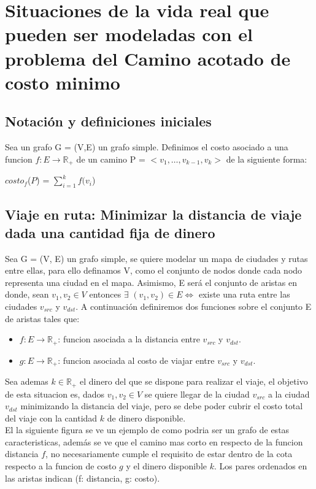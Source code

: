\section{Situaciones de la vida real que pueden ser modeladas con el problema del Camino acotado de costo minimo}
\subsection{Notaci\'on y definiciones iniciales}
Sea un grafo G = (V,E) un grafo simple. Definimos el costo asociado a una funcion $f:E \rightarrow \mathbb{R}_+$ de un camino P = $<v_{1}, \dots, v_{k-1}, v_{k}>$ de la siguiente forma:
\begin{center}
	$costo_f$($P$) = $\sum_{i=1}^{k} f(v_i$)
\end{center}

\subsection{Viaje en ruta: Minimizar la distancia de viaje dada una cantidad fija de dinero}
Sea G = (V, E) un grafo simple, se quiere modelar un mapa de ciudades y rutas entre ellas, para ello definamos V, como el conjunto de nodos donde cada nodo representa una ciudad en el mapa. Asimismo, E ser\'a el conjunto de aristas en donde, sean $v_1,v_2 \in V $ entonces $\exists $ $(v_1,v_2) \in E \Leftrightarrow$ existe una ruta entre las ciudades $v_{src}$ y $v_{dst}$. A continuaci\'on definiremos dos funciones sobre el conjunto E de aristas tales que:
\begin{itemize}
	\item $f:E \rightarrow \mathbb{R}_+$: funcion asociada a la distancia entre $v_{src}$ y $v_{dst}$.
	\item $g:E \rightarrow \mathbb{R}_+$: funcion asociada al costo de viajar entre $v_{src}$ y $v_{dst}$.
\end{itemize}
Sea ademas $k \in \mathbb{R}_+$ el dinero del que se dispone para realizar el viaje, el objetivo de esta situacion es, dados $v_1, v_2 \in V$ se quiere llegar de la ciudad $v_{src}$ a la ciudad $v_{dst}$ minimizando la distancia del viaje, pero se debe poder cubrir el costo total del viaje con la cantidad $k$ de dinero disponible.\\
El la siguiente figura se ve un ejemplo de como podria ser un grafo de estas caracteristicas, adem\'as se ve que el camino mas corto en respecto de la funcion distancia $f$, no necesariamente
cumple el requisito de estar dentro de la cota respecto a la funcion de costo $g$ y el dinero disponible $k$. Los pares ordenados en las aristas indican (f: distancia, g: costo).\\

